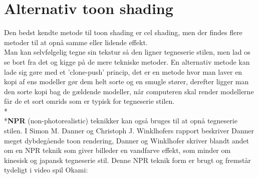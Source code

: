 \newpage
\section{Alternativ toon shading}
Den bedst kendte metode til toon shading er cel shading, men der findes flere metoder til at opnå samme eller lidende effekt.\\
Man kan selvfølgelig tegne sin tekstur så den ligner tegneserie stilen, men lad os se bort fra det og kigge på de mere tekniske metoder. En alternativ metode kan lade sig gøre med et ’clone-push’ princip,\cite{clone-push} det er en metode hvor man laver en kopi af ens modeller gør dem helt sorte og en smugle stører, derefter ligger man den sorte kopi bag de gældende modeller, når computeren skal render modellerne får de et sort omrids som er typisk for tegneserie stilen.\\*\\*\textbf{NPR} (non-photorealistic) teknikker kan også bruges til at opnå tegneserie stilen. I Simon M. Danner og Christoph J. Winklhofers rapport\cite{npr} beskriver Danner meget dybdegående toon rendering, Danner og Winklhofer skriver blandt andet om en NPR teknik som giver billeder en vandfarve effekt, som minder om kinesisk og japansk tegneserie stil. Denne NPR teknik form er brugt og fremstår tydeligt i video spil Okami:
